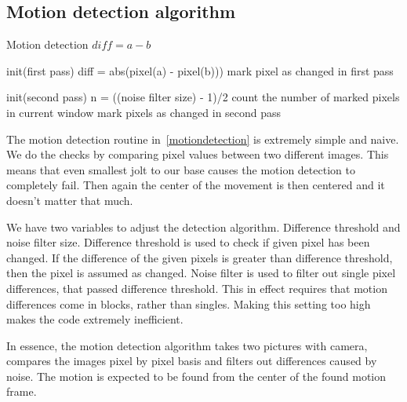 \documentclass[english,11pt,twoside,a4paper]{article}
\begin{document}
\subsection{Motion detection algorithm}

\begin{algorithm}
  \label{motiondetection}
  \caption{Motion detection $diff = a - b$}
  \begin{algorithmic}
    \STATE {}
    \STATE init(first pass)
      \STATE diff = abs(pixel(a) - pixel(b)))
        \STATE mark pixel as changed in first pass
      \ENDIF
    \ENDFOR

    \STATE {}
    \STATE init(second pass)
    \STATE n = ((noise filter size) - 1)/2
      \STATE count the number of marked pixels in current window
        \STATE mark pixels as changed in second pass
      \ENDIF
    \ENDFOR

  \end{algorithmic}
\end{algorithm}

The motion detection routine in~\ref{motiondetection} is extremely simple and naive. We do the checks by comparing pixel values between two different images. This means that even smallest jolt to our base causes the motion detection to completely fail. Then again the center of the movement is then centered and it doesn't matter that much.

We have two variables to adjust the detection algorithm. Difference threshold and noise filter size. Difference threshold is used to check if given pixel has been changed. If the difference of the given pixels is greater than difference threshold, then the pixel is assumed as changed. Noise filter is used to filter out single pixel differences, that passed difference threshold. This in effect requires that motion differences come in blocks, rather than singles. Making this setting too high makes the code extremely inefficient.

In essence, the motion detection algorithm takes two pictures with camera, compares the images pixel by pixel basis and filters out differences caused by noise. The motion is expected to be found from the center of the found motion frame.
\end{document}
